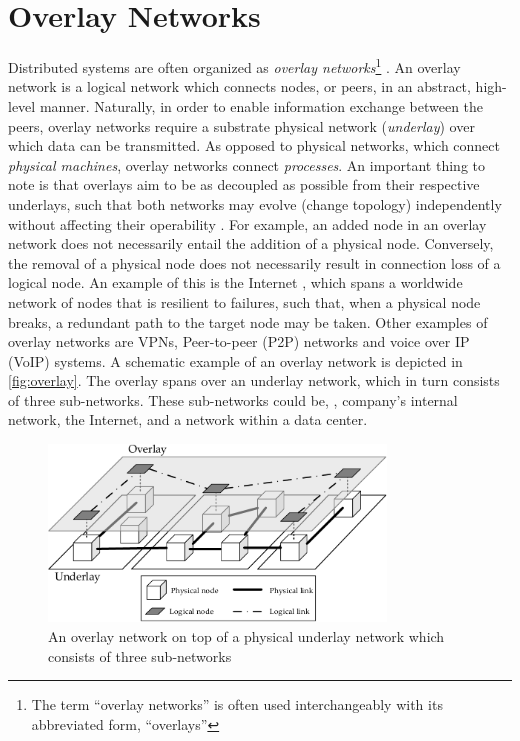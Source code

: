 \section{Overlay Networks}
Distributed systems are often organized as \emph{overlay networks}\footnote{The term ``overlay networks'' is often used interchangeably with its abbreviated form, ``overlays''} \cite{tarkoma2010overlay}. An overlay network is a logical network which connects nodes, or peers, in an abstract, high-level manner. Naturally, in order to enable information exchange between the peers, overlay networks require a substrate physical network (\emph{underlay}) over which data can be transmitted. As opposed to physical networks, which connect \emph{physical machines}, overlay networks connect \emph{processes}. An important thing to note is that overlays aim to be as decoupled as possible from their respective underlays, such that both networks may evolve (change topology) independently without affecting their operability \cite{tanenbaum2017distributed}. For example, an added node in an overlay network does not necessarily entail the addition of a physical node. Conversely, the removal of a physical node does not necessarily result in connection loss of a logical node. An example of this is the Internet \cite{vaezi2017virtualization}, which spans a worldwide network of nodes that is resilient to failures, such that, when a physical node breaks, a redundant path to the target node may be taken. Other examples of overlay networks are VPNs, Peer-to-peer (P2P) networks and voice over IP (VoIP) systems. A schematic example of an overlay network is depicted in \autoref{fig:overlay}. The overlay spans over an underlay network, which in turn consists of three sub-networks. These sub-networks could be, \eg , company's internal network, the Internet, and a network within a data center. 

\begin{figure}[htpb]
  \centering
  \includegraphics[width=0.8\textwidth]{figures/overlay.pdf}
  \caption[Overlay networking concept]{An overlay network on top of a physical underlay network which consists of three sub-networks}\label{fig:overlay}
\end{figure}

